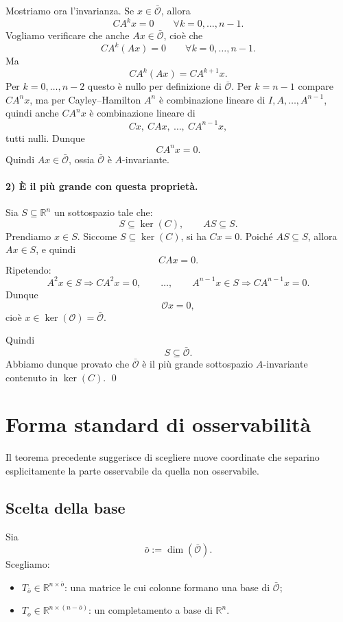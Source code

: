 Mostriamo ora l'invarianza.  
Se \(x\in\bar{\mathcal O}\), allora
\[
CA^k x=0\qquad \forall k=0,\dots,n-1.
\]
Vogliamo verificare che anche \(Ax\in\bar{\mathcal O}\), cioè che
\[
CA^k(Ax)=0
\qquad \forall k=0,\dots,n-1.
\]
Ma
\[
CA^k(Ax)=CA^{k+1}x.
\]
Per \(k=0,\dots,n-2\) questo è nullo per definizione di \(\bar{\mathcal O}\).  
Per \(k=n-1\) compare \(CA^n x\), ma per Cayley--Hamilton \(A^n\) è combinazione lineare di \(I,A,\dots,A^{n-1}\), quindi anche \(CA^n x\) è combinazione lineare di
\[
Cx,\ CAx,\ \dots,\ CA^{n-1}x,
\]
tutti nulli. Dunque
\[
CA^n x=0.
\]
Quindi \(Ax\in\bar{\mathcal O}\), ossia \(\bar{\mathcal O}\) è \(A\)-invariante.

\paragraph{2) È il più grande con questa proprietà.}

Sia \(S\subseteq \mathbb R^n\) un sottospazio tale che:
\[
S\subseteq \ker(C),
\qquad
AS\subseteq S.
\]
Prendiamo \(x\in S\). Siccome \(S\subseteq\ker(C)\), si ha \(Cx=0\).  
Poiché \(AS\subseteq S\), allora \(Ax\in S\), e quindi
\[
CAx=0.
\]
Ripetendo:
\[
A^2x\in S \Rightarrow CA^2x=0,
\qquad \dots,
\qquad A^{n-1}x\in S \Rightarrow CA^{n-1}x=0.
\]
Dunque
\[
\mathcal O x=0,
\]
cioè \(x\in \ker(\mathcal O)=\bar{\mathcal O}\).

Quindi
\[
S\subseteq \bar{\mathcal O}.
\]
Abbiamo dunque provato che \(\bar{\mathcal O}\) è il più grande sottospazio \(A\)-invariante contenuto in \(\ker(C)\). \qed

\section{Forma standard di osservabilità}

Il teorema precedente suggerisce di scegliere nuove coordinate che separino esplicitamente la parte osservabile da quella non osservabile.

\subsection{Scelta della base}

Sia
\[
\bar o := \dim(\bar{\mathcal O}).
\]
Scegliamo:
\begin{itemize}
    \item \(T_{\bar o}\in\mathbb R^{n\times \bar o}\): una matrice le cui colonne formano una base di \(\bar{\mathcal O}\);
    \item \(T_o\in\mathbb R^{n\times (n-\bar o)}\): un completamento a base di \(\mathbb R^n\).
\end{itemize}

